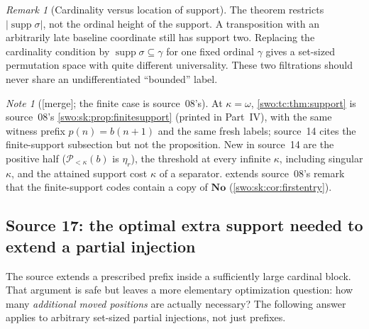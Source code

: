 \documentclass[11pt]{article}
\theoremstyle{definition}
\theoremstyle{remark}
\newtheorem{remark}[remark]{Remark}
\newtheorem{note}[note]{Note}
\newcommand{\No}{\mathbf{No}}
\newcommand{\supp}{\operatorname{supp}}
\newcommand{\merge}{\textsf{[merge]}}
\begin{document}
\begin{remark}[Cardinality versus location of support]\label{swo:tc:n9.5}
The theorem restricts $|\supp\sigma|$, not the ordinal height of the
support. A transposition with an arbitrarily late baseline coordinate
still has support two. Replacing the cardinality condition by
$\supp\sigma\subseteq\gamma$ for one fixed ordinal $\gamma$ gives
a set-sized permutation space with quite different universality. These
two filtrations should never share an undifferentiated ``bounded'' label.
\end{remark}

\begin{note}[\merge; the finite case is source~08's]\label{swo:viii:note:finitesupport}
At $\kappa=\omega$, \cref{swo:tc:thm:support} is source~08's
\cref{swo:sk:prop:finitesupport} (printed in Part~IV), with the same witness
prefix $p(n)=b(n+1)$ and the same fresh labels; source~14 cites the
finite-support subsection but not the proposition. New in source~14 are the
positive half ($\mathcal P_{<\kappa}(b)$ is $\eta_r$), the threshold at
every infinite $\kappa$, including singular $\kappa$, and the attained
support cost $\kappa$ of a separator. 
extends source~08's remark that the finite-support codes contain a copy of
$\No$ (\cref{swo:sk:cor:firstentry}).
\end{note}

\subsection{Source 17: the optimal extra support needed to extend a partial injection}
\label{swo:gs:sec:support}

The source extends a prescribed prefix inside a sufficiently large
cardinal block. That argument is safe but leaves a more elementary
optimization question: how many \emph{additional moved positions} are
actually necessary? The following answer applies to arbitrary set-sized
partial injections, not just prefixes.
\end{document}
